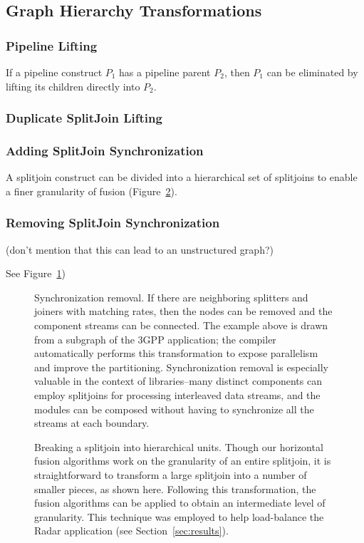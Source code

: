 \subsection{Graph Hierarchy Transformations}

\subsubsection{Pipeline Lifting}

If a pipeline construct $P_1$ has a pipeline parent $P_2$, then $P_1$
can be eliminated by lifting its children directly into $P_2$.

\subsubsection{Duplicate SplitJoin Lifting}

\subsubsection{Adding SplitJoin Synchronization}

A splitjoin construct can be divided into a hierarchical set of
splitjoins to enable a finer granularity of fusion
(Figure~\ref{fig:splitjoin-split}).

\subsubsection{Removing SplitJoin Synchronization}

(don't mention that this can lead to an unstructured graph?)

See Figure~\ref{fig:sync-removal})

\begin{figure}[t]
\centering
{}
\caption{\protect\small Synchronization removal.  If there are
neighboring splitters and joiners with matching rates, then the nodes
can be removed and the component streams can be connected.  The
example above is drawn from a subgraph of the 3GPP application; the
compiler automatically performs this transformation to expose
parallelism and improve the partitioning.  Synchronization removal
is especially valuable in the context of libraries--many distinct
components can employ splitjoins for processing interleaved data
streams, and the modules can be composed without having to synchronize
all the streams at each boundary.  \protect\label{fig:sync-removal}}
\end{figure}

\begin{figure}[t]
\centering
{} 
\caption{\protect\small Breaking a splitjoin into hierarchical units.
Though our horizontal fusion algorithms work on the granularity of an
entire splitjoin, it is straightforward to transform a large splitjoin
into a number of smaller pieces, as shown here.  Following this
transformation, the fusion algorithms can be applied to obtain an
intermediate level of granularity.  This technique was employed to
help load-balance the Radar application (see
Section~\ref{sec:results}).  \protect\label{fig:splitjoin-split}}
\end{figure}
